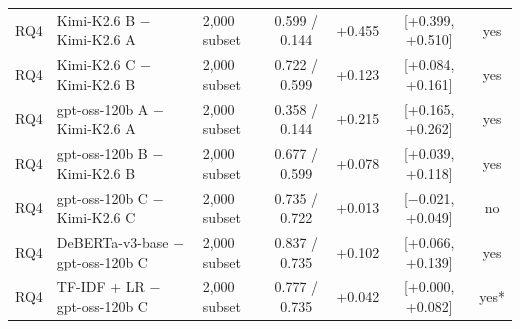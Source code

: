 \begin{tabular}{lllcrcc}
RQ4 & Kimi-K2.6 B $-$ Kimi-K2.6 A & 2,000 subset & 0.599 / 0.144 & +0.455 & [+0.399, +0.510] & yes \\
RQ4 & Kimi-K2.6 C $-$ Kimi-K2.6 B & 2,000 subset & 0.722 / 0.599 & +0.123 & [+0.084, +0.161] & yes \\
RQ4 & gpt-oss-120b A $-$ Kimi-K2.6 A & 2,000 subset & 0.358 / 0.144 & +0.215 & [+0.165, +0.262] & yes \\
RQ4 & gpt-oss-120b B $-$ Kimi-K2.6 B & 2,000 subset & 0.677 / 0.599 & +0.078 & [+0.039, +0.118] & yes \\
RQ4 & gpt-oss-120b C $-$ Kimi-K2.6 C & 2,000 subset & 0.735 / 0.722 & +0.013 & [$-$0.021, +0.049] & no \\
RQ4 & DeBERTa-v3-base $-$ gpt-oss-120b C & 2,000 subset & 0.837 / 0.735 & +0.102 & [+0.066, +0.139] & yes \\
RQ4 & TF-IDF + LR $-$ gpt-oss-120b C & 2,000 subset & 0.777 / 0.735 & +0.042 & [+0.000, +0.082] & yes* \\
\bottomrule
\end{tabular}
